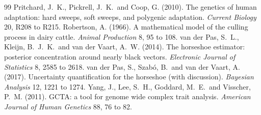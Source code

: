 \begin{small}
\begin{thebibliography}{99}
 Pritchard, J.\ K., Pickrell, J.\ K.\ and Coop, G. (2010). The genetics of human adaptation: hard sweeps, soft sweeps, and polygenic adaptation. \emph{Current Biology} 20, R208 to R215.
 Robertson, A. (1966). A mathematical model of the culling process in dairy cattle. \emph{Animal Production} 8, 95 to 108.
 van der Pas, S.\ L., Kleijn, B.\ J.\ K.\ and van der Vaart, A.\ W. (2014). The horseshoe estimator: posterior concentration around nearly black vectors. \emph{Electronic Journal of Statistics} 8, 2585 to 2618.
 van der Pas, S., Szab\'o, B.\ and van der Vaart, A. (2017). Uncertainty quantification for the horseshoe (with discussion). \emph{Bayesian Analysis} 12, 1221 to 1274.
 Yang, J., Lee, S.\ H., Goddard, M.\ E.\ and Visscher, P.\ M. (2011). GCTA: a tool for genome wide complex trait analysis. \emph{American Journal of Human Genetics} 88, 76 to 82.
\end{thebibliography}
\end{small}
